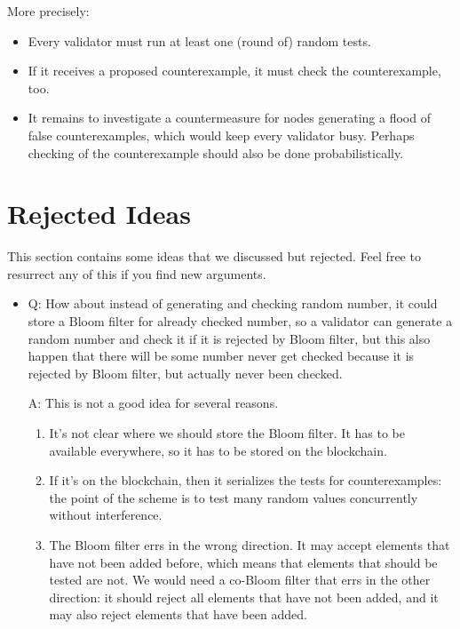 \documentclass{article}
\begin{document}
\begin{itemize}
  More precisely:
  \begin{itemize}
  \item Every validator must run at least one (round of) random tests.  
  \item If it receives a proposed counterexample, it must check the counterexample,
    too.
  \item It remains to investigate a countermeasure for nodes generating a flood of
    false counterexamples, which would keep every validator busy. Perhaps checking of
    the counterexample should also be done probabilistically.
  \end{itemize}
\end{itemize}

\section{Rejected Ideas}
\label{sec:rejected-ideas}

This section contains some ideas that we discussed but rejected. Feel free to resurrect
any of this if you find new arguments.

\begin{itemize}
\item Q: How about instead of generating and checking random number, it could
  store a Bloom filter for already checked number, so a validator can
  generate a random number and check it if it is rejected by Bloom filter,
  but this also happen that there will be some number never get checked
  because it is rejected by Bloom filter, but actually never been checked.

  A: This is not a good idea for several reasons.
  \begin{enumerate}
  \item It's not clear where we should store the Bloom filter. It has to be available
    everywhere, so it has to be stored on the blockchain.
  \item If it's on the blockchain, then it serializes the tests for counterexamples:
    the point of the scheme is to test many random values concurrently without
    interference.
  \item The Bloom filter errs in the wrong direction. It may accept elements that have
    not been added before, which means that elements that should be tested are not. We
    would need a co-Bloom filter that errs in the other direction: it should reject all
    elements that have not been added, and it may also reject elements that have been added.
  \end{enumerate}

\end{itemize}
\end{document}
